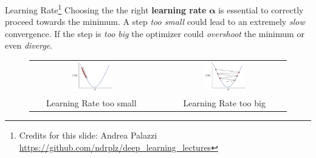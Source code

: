 \setcounter{footnote}{0}
\begin{frame}{Learning Rate\footnote{Credits for this slide: Andrea Palazzi \url{https://github.com/ndrplz/deep_learning_lectures}}}
Choosing the the right \textbf{learning rate} $\bm{\alpha}$ is essential to correctly proceed towards the minimum. A step \textit{too small} could lead to an extremely \textit{slow} convergence. If the step is \textit{too big} the optimizer could \textit{overshoot} the minimum or even \textit{diverge}. 
\begin{figure}
\begin{tabular}{ccc}
\includegraphics[width=0.35\textwidth]{img/sgd/lr_too_small.png} &
\quad &
\includegraphics[width=0.35\textwidth]{img/sgd/lr_too_big.png}\\
Learning Rate too small & & Learning Rate too big
\end{tabular}
\end{figure}

\end{frame}
